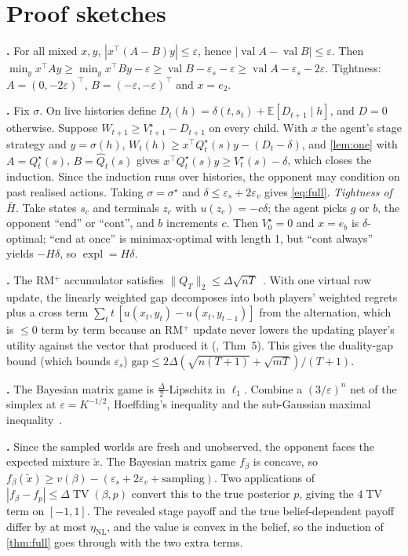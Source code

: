 \documentclass[10pt]{article}
\theoremstyle{plain}
\theoremstyle{definition}
\theoremstyle{remark}
\newcommand{\E}{\mathbb{E}}
\newcommand{\Hbar}{\bar H}
\newcommand{\epss}{\varepsilon_s}
\newcommand{\epsv}{\varepsilon_v}
\newcommand{\etaNL}{\eta_{\mathrm{NL}}}
\newcommand{\Qhat}{\hat Q}
\newcommand{\Qstar}{Q^\star}
\newcommand{\Vstar}{V^\star}
\DeclareMathOperator{\val}{val}
\DeclareMathOperator{\expl}{expl}
\DeclareMathOperator{\TV}{TV}
\begin{document}
\appendix
\section{Proof sketches}
\label{app:proofs}

\textbf{.} For all mixed $x,y$, $|x^\top(A-B)y|\le\varepsilon$, hence $|\val A-\val B|\le\varepsilon$. Then $\min_yx^\top Ay\ge\min_yx^\top By-\varepsilon\ge\val B-\epss-\varepsilon\ge\val A-\epss-2\varepsilon$. Tightness: $A=(0,-2\varepsilon)^\top$, $B=(-\varepsilon,-\varepsilon)^\top$ and $x=e_2$.

\textbf{.} Fix $\sigma$. On live histories define $D_t(h)=\delta(t,s_t)+\E[D_{t+1}\mid h]$, and $D=0$ otherwise. Suppose $W_{t+1}\ge\Vstar_{t+1}-D_{t+1}$ on every child. With $x$ the agent's stage strategy and $y=\sigma(h)$, $W_t(h)\ge x^\top\Qstar_t(s)y-(D_t-\delta)$, and \cref{lem:one} with $A=\Qstar_t(s)$, $B=\Qhat_t(s)$ gives $x^\top\Qstar_t(s)y\ge\Vstar_t(s)-\delta$, which closes the induction. Since the induction runs over histories, the opponent may condition on past realised actions. Taking $\sigma=\sigma^\star$ and $\delta\le\epss+2\epsv$ gives \eqref{eq:full}. \emph{Tightness of $\Hbar$.} Take states $s_c$ and terminals $z_c$ with $u(z_c)=-c\delta$; the agent picks $g$ or $b$, the opponent ``end'' or ``cont'', and $b$ increments $c$. Then $\Vstar_0=0$ and $x=e_b$ is $\delta$-optimal; ``end at once'' is minimax-optimal with length 1, but ``cont always'' yields $-H\delta$, so $\expl=H\delta$.

\textbf{.} The RM$^+$ accumulator satisfies $\lVert Q_T\rVert_2\le\Delta\sqrt{nT}$~\cite{Tammelin15}. With one virtual row update, the linearly weighted gap decomposes into both players' weighted regrets plus a cross term $\sum_tt\,[u(x_t,y_t)-u(x_t,y_{t-1})]$ from the alternation, which is $\le0$ term by term because an RM$^+$ update never lowers the updating player's utility against the vector that produced it (\cite{BMS19}, Thm~5). This gives the duality-gap bound (which bounds $\epss$) $\mathrm{gap}\le2\Delta(\sqrt{n(T+1)}+\sqrt{mT})/(T+1)$.

\textbf{.} The Bayesian matrix game is $\frac\Delta2$-Lipschitz in $\ell_1$. Combine a $(3/\varepsilon)^n$ net of the simplex at $\varepsilon=K^{-1/2}$, Hoeffding's inequality and the sub-Gaussian maximal inequality~\cite{BLM13}.

\textbf{.} Since the sampled worlds are fresh and unobserved, the opponent faces the expected mixture $\tilde x$. The Bayesian matrix game $f_\beta$ is concave, so $f_\beta(\tilde x)\ge v(\beta)-(\epss+2\epsv+\text{sampling})$. Two applications of $|f_\beta-f_p|\le\Delta\TV(\beta,p)$ convert this to the true posterior $p$, giving the $4\TV$ term on $[-1,1]$. The revealed stage payoff and the true belief-dependent payoff differ by at most $\etaNL$, and the value is convex in the belief, so the induction of \cref{thm:full} goes through with the two extra terms.
\end{document}
